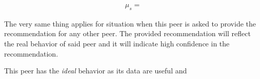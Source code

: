 \begin{equation}
\begin{split}
    \mu_{s} = 
\end{split}
\end{equation}

The very same thing applies for situation when this peer is asked to provide the recommendation for any other peer. 
The provided recommendation will reflect the real behavior of said peer and it will indicate high confidence in the recommendation.

This peer has the \textit{ideal} behavior as its data are useful and 